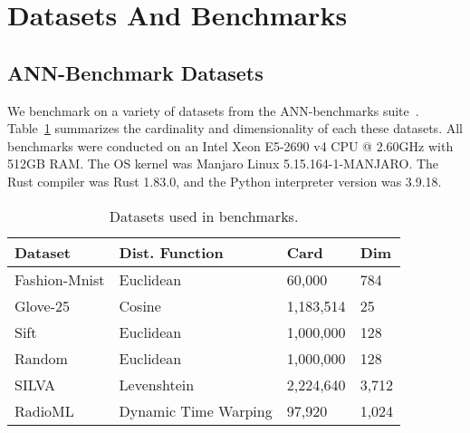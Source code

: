 \section{Datasets And Benchmarks}
\label{sec:datasets-and-benchmarks}

\subsection{ANN-Benchmark Datasets}
\label{sec:datasets-and-benchmarks:ann-benchmark-datasets}

We benchmark on a variety of datasets from the ANN-benchmarks suite~\cite{aumuller2020ann}.
Table~\ref{tab:datasets:summary} summarizes the cardinality and dimensionality of each these datasets.
All benchmarks were conducted on an Intel Xeon E5-2690 v4 CPU @ 2.60GHz with 512GB RAM.
The OS kernel was Manjaro Linux 5.15.164-1-MANJARO.
The Rust compiler was Rust 1.83.0, and the Python interpreter version was 3.9.18.

\begin{table}
    \caption{Datasets used in benchmarks.}
    \label{tab:datasets:summary}
    \begin{center}
        \begin{sc}
            \begin{tabular}{|l|l|l|l|}
                \hline
                \textbf{Dataset} & \textbf{Dist. Function}  &\textbf{Card}  & \textbf{Dim}  \\
                \hline
                Fashion-Mnist    & Euclidean                   & 60,000             & 784                    \\
                \hline
                Glove-25         & Cosine                      & 1,183,514          & 25                     \\
                \hline
                Sift             & Euclidean                   & 1,000,000          & 128                    \\
                \hline
                Random           & Euclidean                   & 1,000,000          & 128                    \\
                \hline
                SILVA            & Levenshtein                 & 2,224,640          & 3,712         \\
                \hline
                RadioML          & Dynamic Time Warping        & 97,920             & 1,024                  \\
                \hline
            \end{tabular}
        \end{sc}
    \end{center}
    \vskip -0.1in
\end{table}


